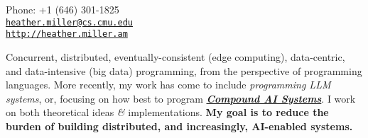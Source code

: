 \documentclass[9pt]{article}
\makeatletter
\def\myemail{heather.miller@cs.cmu.edu}
\def\myweb{http://heather.miller.am}
\def\myphone{+1 (646) 301-1825}
\makeatother
\begin{document}
\begin{minipage}[t]{2.95in}

\end{minipage}
\hfill
\hfill
\begin{minipage}[t]{1.7in}
  \flushright \footnotesize Phone: \myphone \\
  {\scriptsize  \texttt{\href{mailto:\myemail}{\myemail}}} \\
  {\scriptsize  \vspace{-0.03in} \texttt{\href{\myweb}{\myweb}}}
\end{minipage}


\medskip

\reversemarginpar

\medskip
\bigskip




\textheight=580pt

\noindent Concurrent, distributed, eventually-consistent (edge computing), data-centric, and data-intensive (big data) programming, from the perspective of programming languages. More recently, my work has come to include {\em programming LLM systems}, or, focusing on how best to program \textit{\textbf{\href{https://bair.berkeley.edu/blog/2024/02/18/compound-ai-systems/}{Compound AI Systems}}}. I work on both theoretical ideas {\em \&} implementations. {\bf My goal is to reduce the burden of building distributed, and increasingly, AI-enabled systems.}
\bigskip
\end{document}
